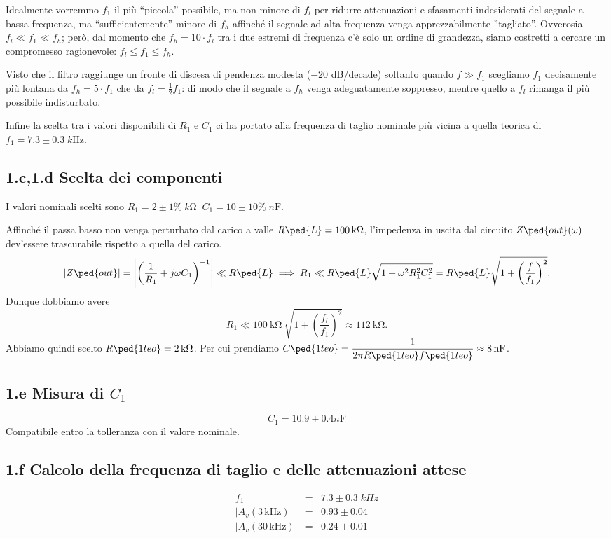\documentclass[10pt, a4paper, italian]{article}
\begin{document}
Idealmente vorremmo $f_1$ il più ``piccola'' possibile, ma non minore
di $f_l$ per ridurre attenuazioni e sfasamenti indesiderati del segnale
a bassa frequenza, ma ``sufficientemente'' minore di $f_h $ affinché il
segnale ad alta frequenza venga apprezzabilmente ''tagliato''. Ovverosia
$f_l \ll f_1 \ll f_h$; però, dal momento che $f_h = 10 \cdot f_l$ tra i due
estremi di frequenza c'è solo un ordine di grandezza, siamo costretti a
cercare un compromesso ragionevole: $f_l \leq f_1 \leq f_h$.

Visto che il filtro raggiunge un fronte di discesa di pendenza modesta
($-20$ dB/decade) soltanto quando $f \gg f_1$ scegliamo $f_1$ decisamente
più lontana da $f_h = 5 \cdot f_1$ che da $f_l = \frac{1}{2} f_1$:
di modo che il segnale a $f_h$ venga adeguatamente soppresso, mentre quello
a $f_l$ rimanga il più possibile indisturbato.

Infine la scelta tra i valori disponibili di $R_1$ e $C_1$ ci ha portato alla
frequenza di taglio nominale più vicina a quella teorica di 
$f_1 = 7.3 \pm 0.3 \; \si{k\Hz}$. 

\subsection*{1.c,1.d Scelta dei componenti}

I valori nominali scelti sono $R_1 = 2 \pm 1\% \; \si{k\ohm} \;\; 
C_1 = 10 \pm 10\% \; \si{n\F}$.  

Affinché il passa basso non venga perturbato dal carico a valle
$R\ped{L} = \SI{100}{\kilo\ohm}$, l'impedenza in uscita dal circuito
$Z\ped{out}(\omega)$ dev'essere trascurabile rispetto a quella del carico.
\[
\abs{Z\ped{out}} = \abs{\left(\frac{1}{R_1} + j\omega 
C_1\right)^{-1}} \ll R\ped{L} \implies R_1 \ll
R\ped{L} \sqrt{1 + \omega^2 R_1^2 C_1^2} =
R\ped{L} \sqrt{1 + \left(\frac{f}{f_1}\right)^2}.
\]
Dunque dobbiamo avere
\[
R_1 \ll \SI{100}{\kilo\ohm}  \ \sqrt{1 + 
\left(\frac{f_l}{f_1}\right)^2} \approx \SI{112}{\kilo\ohm}.
\]
Abbiamo quindi scelto $R\ped{1 teo} = \SI{2}{\kilo\ohm}$.
Per cui prendiamo $C\ped{1 teo} =
\ds \frac{1}{2\pi R\ped{1 teo} f\ped{1 teo}} \approx \SI{8}{\nano\farad}$. 
\subsection*{1.e Misura di $C_1$}
\[
C_1 = 10.9 \pm 0.4 \si{n\F}
\]
Compatibile entro la tolleranza con il valore nominale.

\subsection*{1.f Calcolo della frequenza di taglio e delle attenuazioni attese}
\[
\begin{array}{rcl}
f_1 &=& 7.3 \pm 0.3 \; \si{kHz}\\ 
|A_v(3\,\mathrm{kHz})| &=& 0.93 \pm 0.04 \\
|A_v(30\,\mathrm{kHz})| &=& 0.24 \pm 0.01
\end{array}
\]
\end{document}
